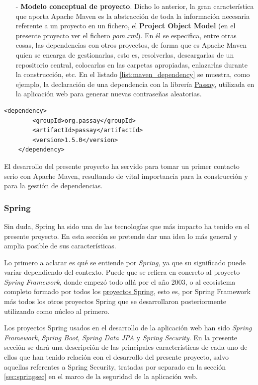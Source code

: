 \documentclass[a4paper]{article}
\begin{document}
\begin{itemize}
		\item[-] \textbf{Modelo conceptual de proyecto}. Dicho lo anterior, la gran característica que aporta Apache Maven es la abstracción de toda la información necesaria referente a un proyecto en un fichero, el \textbf{Project Object Model} (en el presente proyecto ver el fichero \emph{pom.xml}). En él se especifica, entre otras cosas, las dependencias con otros proyectos, de forma que es Apache Maven quien se encarga de gestionarlas, esto es, resolverlas, descargarlas de un repositorio central, colocarlas en las carpetas apropiadas, enlazarlas durante la construcción, etc. En el listado \ref{list:maven_dependency} se muestra, como ejemplo, la declaración de una dependencia con la librería \href{https://www.passay.org/}{Passay}, utilizada en la aplicación web para generar nuevas contraseñas aleatorias. 
	\end{itemize}

	\begin{lstlisting}[caption=Declaración de dependencia en Apache Maven, label=list:maven_dependency]
	<dependency>
		<groupId>org.passay</groupId>
		<artifactId>passay</artifactId>
		<version>1.5.0</version>
	</dependency>
	\end{lstlisting}

	El desarrollo del presente proyecto ha servido para tomar un primer contacto serio con Apache Maven, resultando de vital importancia para la construcción y para la gestión de dependencias.
	
    \subsubsection{Spring} \label{sec:spring}
    Sin duda, Spring ha sido una de las tecnologías que más impacto ha tenido en el presente proyecto. En esta sección se pretende dar una idea lo más general y amplia posible de sus características.
    
    Lo primero a aclarar es qué se entiende por \emph{Spring}, ya que su significado puede variar dependiendo del contexto. Puede que se refiera en concreto al proyecto \emph{Spring Framework}, donde empezó todo allá por el año 2003, o al ecosistema completo formado por todos los \href{https://spring.io/projects}{proyectos Spring}, esto es, por Spring Framework más todos los otros proyectos Spring que se desarrollaron posteriormente utilizando como núcleo al primero.
    
    Los proyectos Spring usados en el desarrollo de la aplicación web han sido \emph{Spring Framework}, \emph{Spring Boot}, \emph{Spring Data JPA} y \emph{Spring Security}. En la presente sección se dará una descripción de las principales características de cada uno de ellos que han tenido relación con el desarrollo del presente proyecto, salvo aquellas referentes a Spring Security, tratadas por separado en la sección \ref{sec:springsec} en el marco de la seguridad de la aplicación web.
    
\end{document}
